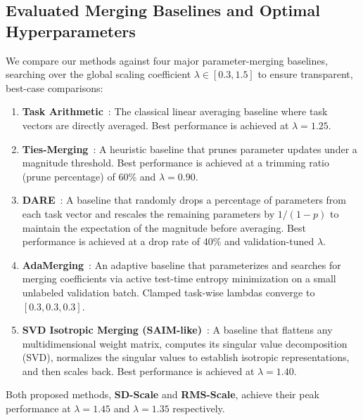 \subsection{Evaluated Merging Baselines and Optimal Hyperparameters}

We compare our methods against four major parameter-merging baselines, searching over the global scaling coefficient $\lambda \in [0.3, 1.5]$ to ensure transparent, best-case comparisons:
\begin{enumerate}
    \item \textbf{Task Arithmetic}~\cite{ilharco2022editing}: The classical linear averaging baseline where task vectors are directly averaged. Best performance is achieved at $\lambda = 1.25$.
    \item \textbf{Ties-Merging}~\cite{yadav2023resolving}: A heuristic baseline that prunes parameter updates under a magnitude threshold. Best performance is achieved at a trimming ratio (prune percentage) of 60\% and $\lambda = 0.90$.
    \item \textbf{DARE}~\cite{yu24dare}: A baseline that randomly drops a percentage of parameters from each task vector and rescales the remaining parameters by $1 / (1 - p)$ to maintain the expectation of the magnitude before averaging. Best performance is achieved at a drop rate of 40\% and validation-tuned $\lambda$.
    \item \textbf{AdaMerging}~\cite{yang2024adamerging}: An adaptive baseline that parameterizes and searches for merging coefficients via active test-time entropy minimization on a small unlabeled validation batch. Clamped task-wise lambdas converge to $[0.3, 0.3, 0.3]$.
    \item \textbf{SVD Isotropic Merging (SAIM-like)}~\cite{saim25flat}: A baseline that flattens any multidimensional weight matrix, computes its singular value decomposition (SVD), normalizes the singular values to establish isotropic representations, and then scales back. Best performance is achieved at $\lambda = 1.40$.
\end{enumerate}

Both proposed methods, \textbf{SD-Scale} and \textbf{RMS-Scale}, achieve their peak performance at $\lambda = 1.45$ and $\lambda = 1.35$ respectively.


